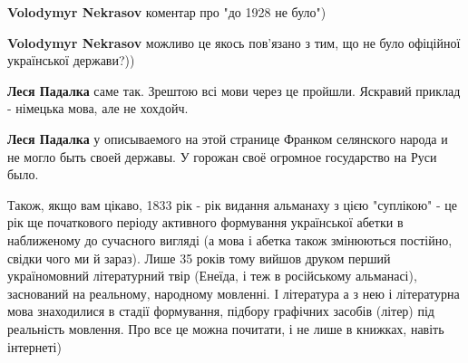\begin{itemize}
\begin{itemize}
\begin{itemize}
\textbf{Volodymyr Nekrasov} коментар про "до 1928 не було")
\end{itemize}

 
\textbf{Volodymyr Nekrasov} можливо це якось пов'язано з тим, що не було офіційної української держави?))

\begin{itemize}
 
\textbf{Леся Падалка} саме так. Зрештою всі мови через це пройшли. Яскравий приклад - німецька мова, але не хохдойч.


 
\textbf{Леся Падалка} у описываемого на этой странице Франком селянского народа и не могло быть своей державы.
У горожан своё огромное государство на Руси было.
\end{itemize}

\end{itemize}

 

Також, якщо вам цікаво, 1833 рік - рік видання альманаху з цією "суплікою" - це
рік ще початкового періоду активного формування української абетки в
наближеному до сучасного вигляді (а мова і абетка також змінюються постійно,
свідки чого ми й зараз). Лише 35 років тому вийшов друком перший україномовний
літературний твір (Енеїда, і теж в російському альманасі), заснований на
реальному, народному мовленні. І література а з нею і літературна мова
знаходилися в стадії формування, підбору графічних засобів (літер) під
реальність мовлення. Про все це можна почитати, і не лише в книжках, навіть
інтернеті)


\end{itemize}
